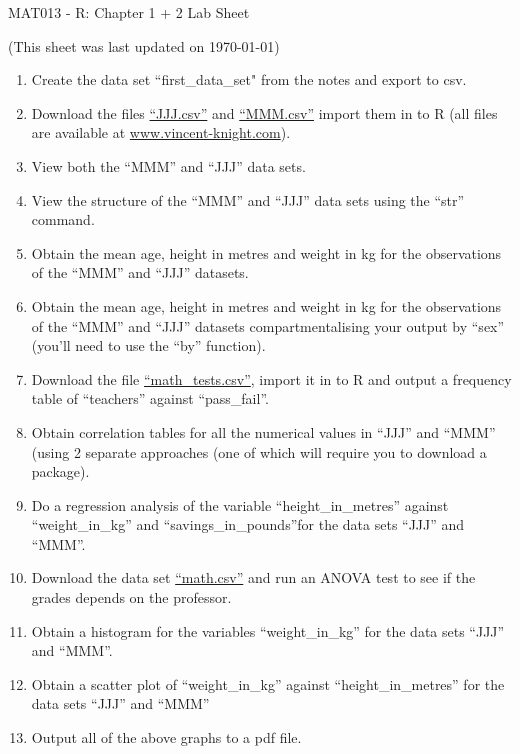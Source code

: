 \documentclass[12pt]{article}
\begin{document}
\begin{center}
\huge{MAT013 - R: Chapter 1 + 2 Lab Sheet}\\
\begin{center}
\tiny{(This sheet was last updated on \today)}
\end{center}
\end{center}

\begin{enumerate}
\item Create the data set ``first\_data\_set" from the notes and export to csv.
\item Download the files \href{https://docs.google.com/file/d/0Bx_zrw5uAafbVlNkSzJNWHFWSkU/edit}{``JJJ.csv''} and  \href{https://docs.google.com/file/d/0Bx_zrw5uAafbSlYwcGtPUXl2Rlk/edit}{``MMM.csv''} import them in to R (all files are available at \url{www.vincent-knight.com}).
\item View both the ``MMM'' and ``JJJ'' data sets.
\item View the structure of the ``MMM'' and ``JJJ'' data sets using the ``str'' command.
\item Obtain the mean age, height in metres and weight in kg for the observations of the ``MMM'' and ``JJJ'' datasets. 
\item Obtain the mean age, height in metres and weight in kg for the observations of the ``MMM'' and ``JJJ'' datasets compartmentalising your output by ``sex'' (you'll need to use the ``by'' function).
\item Download the file \href{https://docs.google.com/file/d/0Bx_zrw5uAafbdFNZUUZFblhfZGc/edit}{``math\_tests.csv''}, import it in to R and output a frequency table of ``teachers'' against ``pass\_fail''.
\item Obtain correlation tables for all the numerical values in ``JJJ'' and ``MMM'' (using 2 separate approaches (one of which will require you to download a package).
\item Do a regression analysis of the variable ``height\_in\_metres'' against ``weight\_in\_kg'' and ``savings\_in\_pounds''for the data sets ``JJJ'' and ``MMM''.
\item Download the data set \href{https://docs.google.com/file/d/0Bx_zrw5uAafbQ1ZJOUJxdGtYb1U/edit}{``math.csv''} and run an ANOVA test to see if the grades depends on the professor.
\item Obtain a histogram for the variables ``weight\_in\_kg'' for the data sets ``JJJ'' and ``MMM''.
\item Obtain a scatter plot of ``weight\_in\_kg'' against ``height\_in\_metres'' for the data sets ``JJJ'' and ``MMM''
\item Output all of the above graphs to a pdf file.
\end{enumerate}
\end{document}
